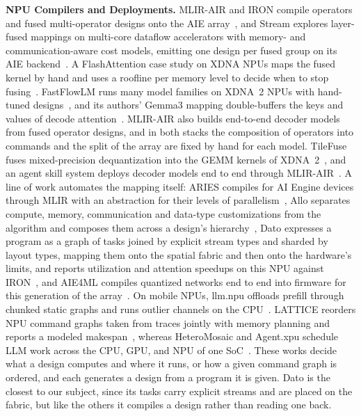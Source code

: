 \textbf{NPU Compilers and Deployments.}
MLIR-AIR and IRON compile operators and fused multi-operator designs onto the AIE array~\citep{wang2026mlirair,hunhoff2025iron}, and Stream explores layer-fused mappings on multi-core dataflow accelerators with memory- and communication-aware cost models, emitting one design per fused group on its AIE backend~\citep{symons2025stream}.
A FlashAttention case study on XDNA NPUs maps the fused kernel by hand and uses a roofline per memory level to decide when to stop fusing~\citep{wang2026flashattention}.
FastFlowLM runs many model families on XDNA~2 NPUs with hand-tuned designs~\citep{fastflowlm-repo}, and its authors' Gemma3 mapping double-buffers the keys and values of decode attention~\citep{du2026gemma3}.
MLIR-AIR also builds end-to-end decoder models from fused operator designs, and in both stacks the composition of operators into commands and the split of the array are fixed by hand for each model.
TileFuse fuses mixed-precision dequantization into the GEMM kernels of XDNA~2~\citep{pang2026tilefuse}, and an agent skill system deploys decoder models end to end through MLIR-AIR~\citep{li2026agentnpu}.
A line of work automates the mapping itself: ARIES compiles for AI Engine devices through MLIR with an abstraction for their levels of parallelism~\citep{zhuang2025aries}, Allo separates compute, memory, communication and data-type customizations from the algorithm and composes them across a design's hierarchy~\citep{chen2024allo}, Dato expresses a program as a graph of tasks joined by explicit stream types and sharded by layout types, mapping them onto the spatial fabric and then onto the hardware's limits, and reports utilization and attention speedups on this NPU against IRON~\citep{fang2025dato}, and AIE4ML compiles quantized networks end to end into firmware for this generation of the array~\citep{danopoulos2025aie4ml}.
On mobile NPUs, llm.npu offloads prefill through chunked static graphs and runs outlier channels on the CPU~\citep{xu2025llmnpu}.
LATTICE reorders NPU command graphs taken from traces jointly with memory planning and reports a modeled makespan~\citep{liu2026lattice}, whereas HeteroMosaic and Agent.xpu schedule LLM work across the CPU, GPU, and NPU of one SoC~\citep{jun2026heteromosaic,wei2025agentxpu}.
These works decide what a design computes and where it runs, or how a given command graph is ordered, and each generates a design from a program it is given. Dato is the closest to our subject, since its tasks carry explicit streams and are placed on the fabric, but like the others it compiles a design rather than reading one back.
